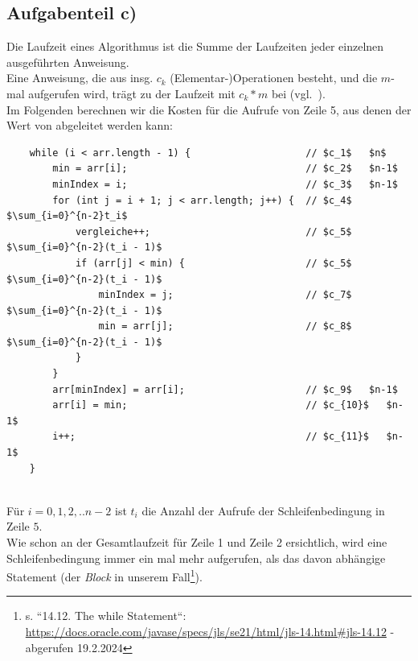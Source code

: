\subsection{Aufgabenteil c)}

Die Laufzeit eines Algorithmus ist die Summe der Laufzeiten jeder einzelnen ausgeführten Anweisung.\\
Eine Anweisung, die aus insg. $c_k$ (Elementar-)Operationen besteht, und die $m$-mal aufgerufen wird, trägt zu der Laufzeit mit $c_k * m$ bei (vgl.~\cite[29 f.]{CL22}).\\

\noindent
Im Folgenden berechnen wir die Kosten für die Aufrufe von Zeile 5, aus denen der Wert von  abgeleitet werden kann:

\begin{verbatim}
    while (i < arr.length - 1) {                    // $c_1$   $n$
        min = arr[i];                               // $c_2$   $n-1$
        minIndex = i;                               // $c_3$   $n-1$
        for (int j = i + 1; j < arr.length; j++) {  // $c_4$   $\sum_{i=0}^{n-2}t_i$
            vergleiche++;                           // $c_5$   $\sum_{i=0}^{n-2}(t_i - 1)$
            if (arr[j] < min) {                     // $c_5$   $\sum_{i=0}^{n-2}(t_i - 1)$
                minIndex = j;                       // $c_7$   $\sum_{i=0}^{n-2}(t_i - 1)$
                min = arr[j];                       // $c_8$   $\sum_{i=0}^{n-2}(t_i - 1)$
            }
        }
        arr[minIndex] = arr[i];                     // $c_9$   $n-1$
        arr[i] = min;                               // $c_{10}$   $n-1$
        i++;                                        // $c_{11}$   $n-1$
    }
\end{verbatim}\\

\noindent
Für $i = 0, 1, 2, .. n - 2$ ist $t_i$ die Anzahl der Aufrufe der Schleifenbedingung in Zeile $5$.\\
Wie schon an der Gesamtlaufzeit für Zeile 1 und Zeile 2 ersichtlich, wird eine Schleifenbedingung immer ein mal mehr aufgerufen, als das davon abhängige Statement (der \textit{Block} in unserem Fall\footnote{s. ``14.12. The while Statement``: \url{https://docs.oracle.com/javase/specs/jls/se21/html/jls-14.html#jls-14.12} - abgerufen 19.2.2024
}).\\


